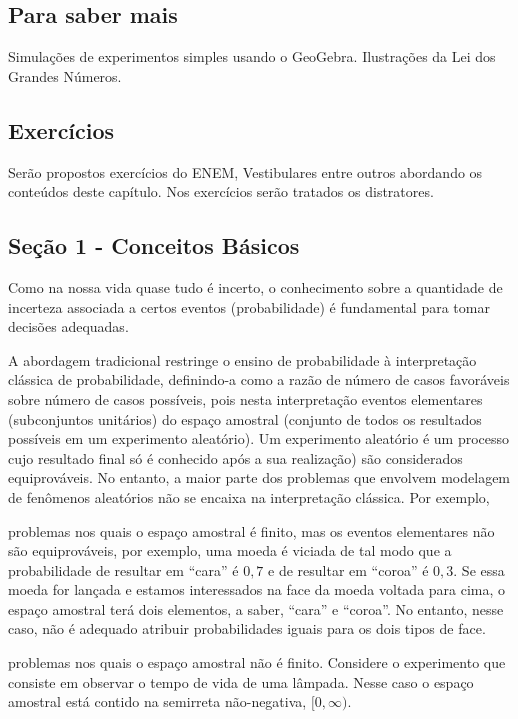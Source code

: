 \begin{apresentacao}
\subsection{Para saber mais}
Simulações de experimentos simples usando o GeoGebra. Ilustrações da Lei dos Grandes Números.

\subsection{Exercícios}
Serão propostos exercícios do ENEM, Vestibulares entre outros abordando os conteúdos deste capítulo. Nos exercícios serão tratados os distratores.

\end{apresentacao}

\def\currentcolor{session1}
\begin{texto}
{\section{Seção 1 - Conceitos Básicos}

  Como na nossa vida quase tudo é incerto, o conhecimento sobre a quantidade de incerteza associada a certos eventos (probabilidade) é fundamental para tomar decisões adequadas.

  A abordagem tradicional restringe o ensino de probabilidade à interpretação clássica de probabilidade, definindo-a como a razão de número de casos favoráveis sobre número de casos possíveis, pois nesta interpretação eventos elementares (subconjuntos unitários) do espaço amostral (conjunto de todos os resultados possíveis em um experimento aleatório). Um experimento aleatório é um processo cujo resultado final só é conhecido após a sua realização) são considerados equiprováveis. No entanto, a maior parte dos problemas que envolvem modelagem de fenômenos aleatórios não se encaixa na interpretação clássica. Por exemplo,

  problemas nos quais o espaço amostral é finito, mas os eventos elementares não são equiprováveis, por exemplo, uma moeda é viciada de tal modo que a probabilidade de resultar em “cara”{} é $0{,}7$ e de resultar em “coroa”{} é $0{,}3$. Se essa moeda for lançada e estamos interessados na face da moeda voltada para cima, o espaço amostral terá dois elementos, a saber, “cara”{} e “coroa”. No entanto, nesse caso, não é adequado atribuir probabilidades iguais para os dois tipos de face.

  problemas nos quais o espaço amostral não é finito. Considere o experimento que consiste em observar o tempo de vida de uma lâmpada. Nesse caso o espaço amostral está contido na semirreta não-negativa, $[0,\infty)$.

}
\end{texto}
